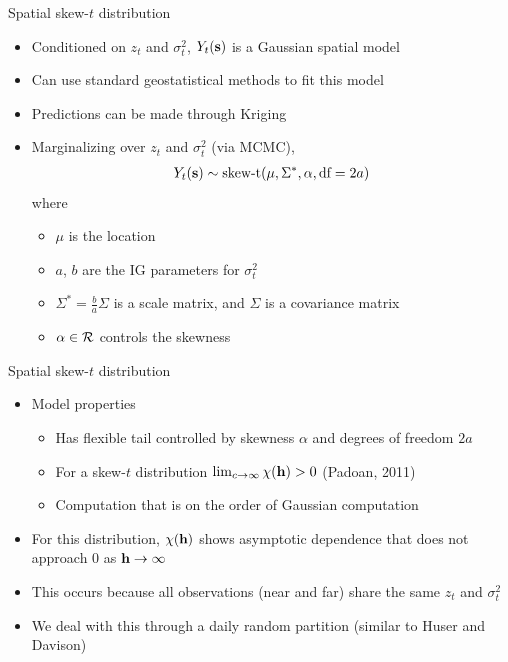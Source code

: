 \documentclass{beamer}
\begin{document}
\begin{frame}{Spatial skew-$t$ distribution}
  \begin{itemize} \setlength{\itemsep}{0.5em}
   \item \alert{Conditioned} on $z_t$ and $\sigma^2_t$, $Y_t(\mbox{\bf s})$ is a Gaussian spatial model
    \item Can use standard geostatistical methods to fit this model
    \item Predictions can be made through Kriging
    \item \alert{Marginalizing} over $z_t$ and $\sigma^2_t$ (via MCMC),
    \begin{align*}
      Y_t(\mbox{\bf s}) \sim \text{skew-t}(\mu, \Sigma^*, \alpha, \text{df}=2a)
    \end{align*}
    where
    \begin{itemize}
    	\item $\mu$ is the location
	\item $a$, $b$ are the IG parameters for $\sigma^2_t$
	\item $\Sigma^* = \frac{ b }{ a } \Sigma$ is a scale matrix, and $\Sigma$ is a \Matern covariance matrix
	\item $\alpha \in {\cal R}$ controls the skewness
    \end{itemize}
  \end{itemize}
\end{frame}

\begin{frame}{Spatial skew-$t$ distribution}
  \begin{itemize} \setlength{\itemsep}{0.5em}
      \item Model properties
    \begin{itemize}
    	\item Has flexible tail controlled by skewness $\alpha$ and degrees of freedom $2a$
    	\item For a skew-$t$ distribution $\lim_{c \rightarrow \infty} \chi(\mbox{\bf h}) > 0$ (Padoan, 2011)
    	\item Computation that is on the order of Gaussian computation
    \end{itemize}
    \item For this distribution, $\chi(\mbox{\bf h})$ shows asymptotic dependence that does not approach 0 as $\mbox{\bf h} \rightarrow \infty$
   \item This occurs because all observations (near and far) share the same $z_t$ and $\sigma_t^2$
    \item We deal with this through a daily random partition (similar to Huser and Davison)
  \end{itemize}
\end{frame}
\end{document}
